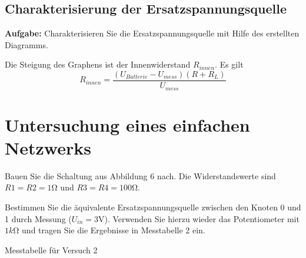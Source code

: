 \documentclass[10pt]{report}
\begin{document}
        \subsection{Charakterisierung der Ersatzspannungsquelle}
        \textbf{Aufgabe:} Charakterisieren Sie die Ersatzspannungsquelle mit Hilfe des erstellten Diagramms.

        \vspace{0.5cm}

        Die Steigung des Graphens ist der Innenwiderstand $R_{innen}$. Es gilt
        \begin{equation*}
            R_{innen} = \frac{(U_{Batterie} - U_{mess})(R+R_L)}{U_{mess}}
        \end{equation*}

        \section{Untersuchung eines einfachen Netzwerks}
        Bauen Sie die Schaltung aus Abbildung 6 nach. Die Widerstandswerte sind $R1 = R2 =
        1 \si{\ohm}$ und $R3 = R4 = 100\si{\ohm}$.

        Bestimmen Sie die äquivalente Ersatzspannungsquelle zwischen den Knoten 0 und 1 durch
        Messung ($U_{in} = 3\si{\volt}$). Verwenden Sie hierzu wieder das Potentiometer mit $1\si{k\ohm}$ und tragen
        Sie die Ergebnisse in Messtabelle 2 ein.

        \begin{table}[h!]
            \begin{center}
                \caption{Messtabelle für Versuch 2}
                \label{tableb}
            \end{center}
        \end{table}
\end{document}
